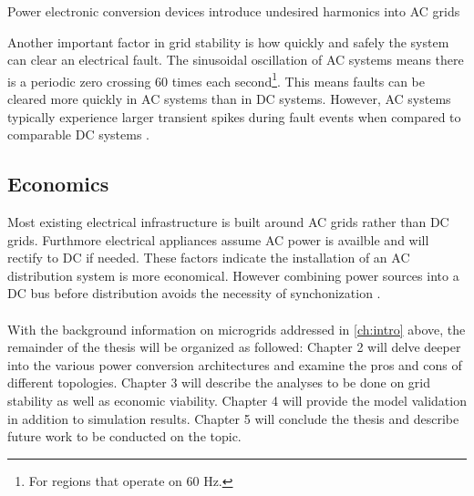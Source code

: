 Power electronic conversion devices introduce undesired harmonics into AC grids\cite{Grotzbach1997}

Another important factor in grid stability is how quickly and safely the system can clear an electrical fault. The sinusoidal oscillation of AC systems means there is a periodic zero crossing 60 times each second\footnote{For regions that operate on 60 Hz.}. This means faults can be cleared more quickly in AC systems than in DC systems.  However, AC systems typically experience larger transient spikes during fault events when compared to comparable DC systems \cite{Estes2011}. 

\subsection{Economics}
Most existing electrical infrastructure is built around AC grids rather than DC grids. Furthmore electrical appliances assume AC power is availble and will rectify to DC if needed. These factors indicate the installation of an AC distribution system is more economical. However combining power sources into a DC bus before distribution avoids the necessity of synchonization \cite{Lotfi2015}.

\paragraph{}
With the background information on microgrids addressed in \autoref{ch:intro} above, the remainder of the thesis will be organized as followed: Chapter 2 will delve deeper into the various power conversion architectures and examine the pros and cons of different topologies. Chapter 3 will describe the analyses to be done on grid stability as well as economic viability. Chapter 4 will provide the model validation in addition to simulation results. Chapter 5 will conclude the thesis and describe future work to be conducted on the topic.

